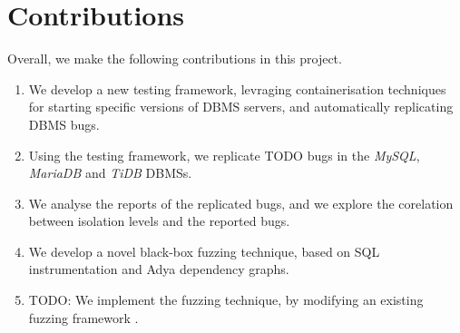 

\section{Contributions}
Overall, we make the following contributions in this project.

\begin{enumerate}
    \item We develop a new testing framework, levraging containerisation techniques for starting specific versions of DBMS servers, and automatically replicating DBMS bugs.
    \item Using the testing framework, we replicate TODO bugs in the \textit{MySQL}, \textit{MariaDB} and \textit{TiDB} DBMSs.
    \item We analyse the reports of the replicated bugs, and we explore the corelation between isolation levels and the reported bugs.
    \item We develop a novel black-box fuzzing technique, based on SQL instrumentation and Adya dependency graphs.
    \item TODO: We implement the fuzzing technique, by modifying an existing fuzzing framework \cite{jiang2023detecting}. 
\end{enumerate}
